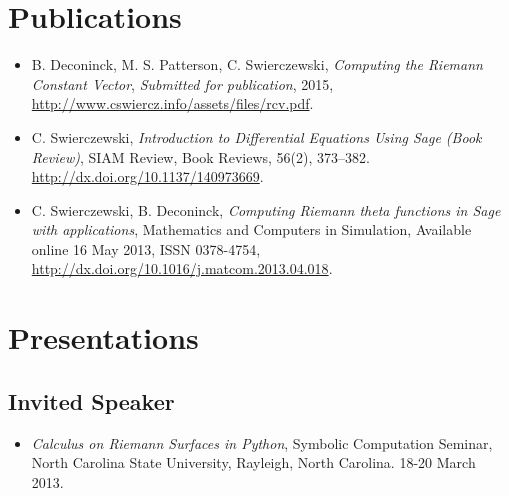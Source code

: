 \documentclass{article}
\begin{document}
\section*{Publications}

\begin{itemize}
\item B. Deconinck, M. S. Patterson, C. Swierczewski, {\it Computing the
  Riemann Constant Vector}, {\it Submitted for publication}, 2015,
  \url{http://www.cswiercz.info/assets/files/rcv.pdf}.
\item C. Swierczewski, {\it Introduction to Differential Equations Using
  Sage (Book Review)}, SIAM Review, Book Reviews, 56(2), 373--382.
  \url{http://dx.doi.org/10.1137/140973669}.
\item C. Swierczewski, B. Deconinck, {\it Computing Riemann theta
  functions in Sage with applications}, Mathematics and Computers in
  Simulation, Available online 16 May 2013, ISSN 0378-4754,
  \\ \url{http://dx.doi.org/10.1016/j.matcom.2013.04.018}.
\end{itemize}

\section*{Presentations}

\subsection*{Invited Speaker}
\begin{itemize}
  \item {\it Calculus on Riemann Surfaces in Python}, Symbolic
    Computation Seminar, North Carolina State University, Rayleigh,
    North Carolina. 18-20 March 2013.
\end{itemize}
\end{document}
